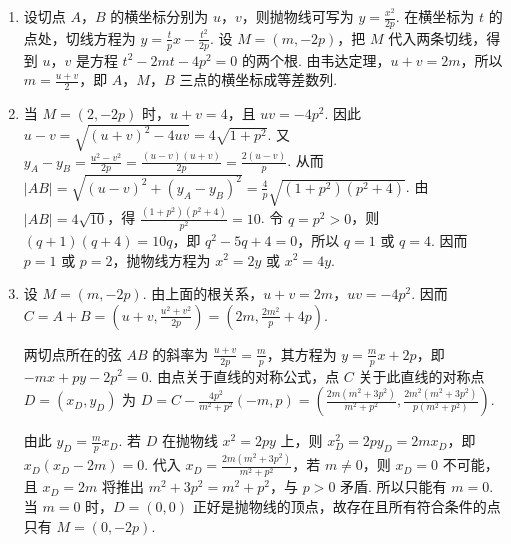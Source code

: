 \begin{solution}
\begin{enumerate}
\item 设切点 \(A\)，\(B\) 的横坐标分别为 \(u\)，\(v\)，则抛物线可写为 \(y=\frac{x^2}{2p}\). 在横坐标为 \(t\) 的点处，切线方程为
\(y=\frac{t}{p}x-\frac{t^2}{2p}\). 设 \(M=(m,-2p)\)，把 \(M\) 代入两条切线，得到 \(u\)，\(v\) 是方程
\(t^2-2mt-4p^2=0\) 的两个根. 由韦达定理，\(u+v=2m\)，所以 \(m=\frac{u+v}{2}\)，即 \(A\)，\(M\)，\(B\) 三点的横坐标成等差数列.

\item 当 \(M=(2,-2p)\) 时，\(u+v=4\)，且 \(uv=-4p^2\). 因此
\(u-v=\sqrt{(u+v)^2-4uv}=4\sqrt{1+p^2}\). 又
\(y_A-y_B=\frac{u^2-v^2}{2p}=\frac{(u-v)(u+v)}{2p}=\frac{2(u-v)}p\). 从而
\(\lvert AB\rvert=\sqrt{(u-v)^2+(y_A-y_B)^2}=\frac4p\sqrt{(1+p^2)(p^2+4)}\). 由 \(\lvert AB\rvert=4\sqrt{10}\)，得
\(\frac{(1+p^2)(p^2+4)}{p^2}=10\). 令 \(q=p^2>0\)，则 \((q+1)(q+4)=10q\)，即 \(q^2-5q+4=0\)，所以 \(q=1\) 或 \(q=4\). 因而 \(p=1\) 或 \(p=2\)，抛物线方程为 \(x^2=2y\) 或 \(x^2=4y\).

\item 设 \(M=(m,-2p)\). 由上面的根关系，\(u+v=2m\)，\(uv=-4p^2\). 因而
\(C=A+B=\left(u+v,\frac{u^2+v^2}{2p}\right)=\left(2m,\frac{2m^2}{p}+4p\right)\).

两切点所在的弦 \(AB\) 的斜率为 \(\frac{u+v}{2p}=\frac{m}{p}\)，其方程为 \(y=\frac{m}{p}x+2p\)，即 \(-mx+py-2p^2=0\). 由点关于直线的对称公式，点 \(C\) 关于此直线的对称点 \(D=(x_D,y_D)\) 为
\(D=C-\frac{4p^2}{m^2+p^2}(-m,p)=\left(\frac{2m(m^2+3p^2)}{m^2+p^2},\frac{2m^2(m^2+3p^2)}{p(m^2+p^2)}\right)\).

由此 \(y_D=\frac{m}{p}x_D\). 若 \(D\) 在抛物线 \(x^2=2py\) 上，则
\(x_D^2=2py_D=2mx_D\)，即 \(x_D(x_D-2m)=0\). 代入 \(x_D=\frac{2m(m^2+3p^2)}{m^2+p^2}\)，若 \(m\neq0\)，则 \(x_D=0\) 不可能，且 \(x_D=2m\) 将推出 \(m^2+3p^2=m^2+p^2\)，与 \(p>0\) 矛盾. 所以只能有 \(m=0\). 当 \(m=0\) 时，\(D=(0,0)\) 正好是抛物线的顶点，故存在且所有符合条件的点只有 \(M=(0,-2p)\).
\end{enumerate}
\end{solution}
